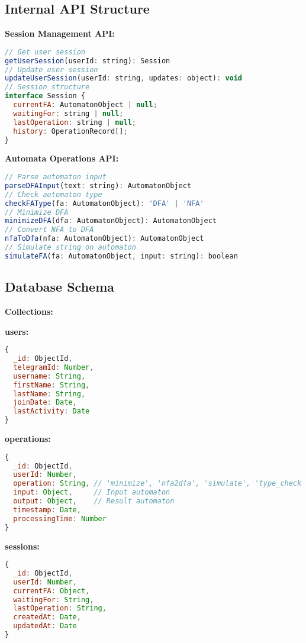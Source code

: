 \documentclass[12pt]{article}
\begin{document}
\subsection{Internal API Structure}
\textbf{Session Management API:}
\begin{lstlisting}[language=JavaScript]
// Get user session
getUserSession(userId: string): Session
// Update user session
updateUserSession(userId: string, updates: object): void
// Session structure
interface Session {
  currentFA: AutomatonObject | null;
  waitingFor: string | null;
  lastOperation: string | null;
  history: OperationRecord[];
}
\end{lstlisting}
\textbf{Automata Operations API:}
\begin{lstlisting}[language=JavaScript]
// Parse automaton input
parseDFAInput(text: string): AutomatonObject
// Check automaton type
checkFAType(fa: AutomatonObject): 'DFA' | 'NFA'
// Minimize DFA
minimizeDFA(dfa: AutomatonObject): AutomatonObject
// Convert NFA to DFA
nfaToDfa(nfa: AutomatonObject): AutomatonObject
// Simulate string on automaton
simulateFA(fa: AutomatonObject, input: string): boolean
\end{lstlisting}

\subsection{Database Schema}
\textbf{Collections:}

\textbf{users:}
\begin{lstlisting}[language=JavaScript]
{
  _id: ObjectId,
  telegramId: Number,
  username: String,
  firstName: String,
  lastName: String,
  joinDate: Date,
  lastActivity: Date
}
\end{lstlisting}

\textbf{operations:}
\begin{lstlisting}[language=JavaScript]
{
  _id: ObjectId,
  userId: Number,
  operation: String, // 'minimize', 'nfa2dfa', 'simulate', 'type_check'
  input: Object,     // Input automaton
  output: Object,    // Result automaton
  timestamp: Date,
  processingTime: Number
}
\end{lstlisting}

\textbf{sessions:}
\begin{lstlisting}[language=JavaScript]
{
  _id: ObjectId,
  userId: Number,
  currentFA: Object,
  waitingFor: String,
  lastOperation: String,
  createdAt: Date,
  updatedAt: Date
}
\end{lstlisting}
\end{document}
